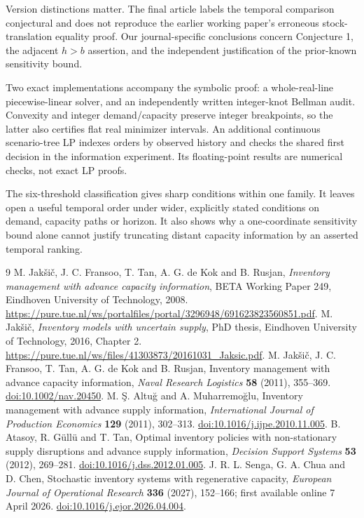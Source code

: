 \documentclass[11pt]{article}
\theoremstyle{remark}\newtheorem{remark}[theorem]{Remark}
\begin{document}
Version distinctions matter. The final article labels the temporal
comparison conjectural and does not reproduce the earlier working
paper's erroneous stock-translation equality proof. Our journal-specific
conclusions concern Conjecture 1, the adjacent $h>b$ assertion, and the
independent justification of the prior-known sensitivity bound.

Two exact implementations accompany the symbolic proof: a whole-real-line
piecewise-linear solver, and an independently written integer-knot
Bellman audit. Convexity and integer demand/capacity preserve integer
breakpoints, so the latter also certifies flat real minimizer intervals.
An additional continuous scenario-tree LP indexes orders by observed
history and checks the shared first decision in the information experiment.
Its floating-point results are numerical checks, not exact LP proofs.

The six-threshold classification gives sharp conditions within one family.
It leaves open a useful temporal order under wider, explicitly stated
conditions on demand, capacity paths or horizon. It also shows why a
one-coordinate sensitivity bound alone cannot justify truncating distant
capacity information by an asserted temporal ranking.

\begin{thebibliography}{9}
M. Jak\v{s}i\v{c}, J. C. Fransoo, T. Tan, A. G. de Kok and B. Rusjan,
\emph{Inventory management with advance capacity information},
BETA Working Paper 249, Eindhoven University of Technology, 2008.
\url{https://pure.tue.nl/ws/portalfiles/portal/3296948/691623823560851.pdf}.
M. Jak\v{s}i\v{c}, \emph{Inventory models with uncertain supply},
PhD thesis, Eindhoven University of Technology, 2016, Chapter 2.
\url{https://pure.tue.nl/ws/files/41303873/20161031_Jaksic.pdf}.
M. Jak\v{s}i\v{c}, J. C. Fransoo, T. Tan, A. G. de Kok and B. Rusjan,
Inventory management with advance capacity information,
\emph{Naval Research Logistics} \textbf{58} (2011), 355--369.
\href{https://doi.org/10.1002/nav.20450}{doi:10.1002/nav.20450}.
M. \c{S}. Altu\u{g} and A. Muharremo\u{g}lu,
Inventory management with advance supply information,
\emph{International Journal of Production Economics} \textbf{129} (2011), 302--313.
\href{https://doi.org/10.1016/j.ijpe.2010.11.005}{doi:10.1016/j.ijpe.2010.11.005}.
B. Atasoy, R. G\"ull\"u and T. Tan,
Optimal inventory policies with non-stationary supply disruptions and advance
supply information, \emph{Decision Support Systems} \textbf{53} (2012), 269--281.
\href{https://doi.org/10.1016/j.dss.2012.01.005}{doi:10.1016/j.dss.2012.01.005}.
J. R. L. Senga, G. A. Chua and D. Chen,
Stochastic inventory systems with regenerative capacity,
\emph{European Journal of Operational Research} \textbf{336} (2027), 152--166;
first available online 7 April 2026.
\href{https://doi.org/10.1016/j.ejor.2026.04.004}{doi:10.1016/j.ejor.2026.04.004}.
\end{thebibliography}
\end{document}
